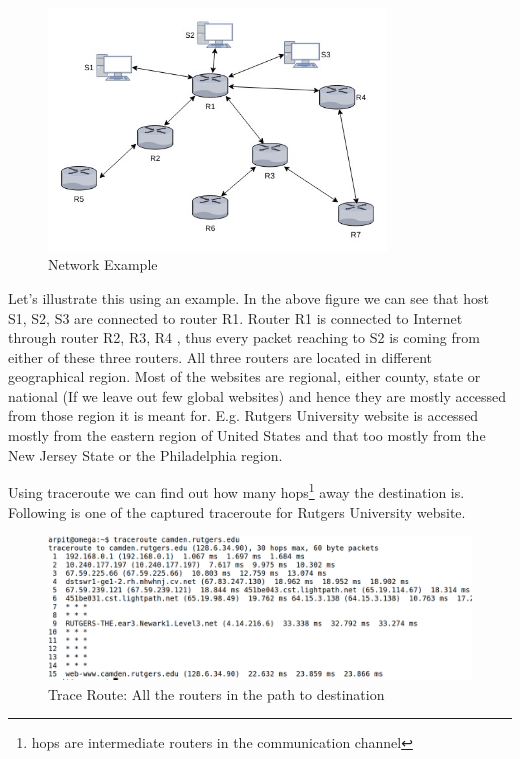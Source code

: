\documentclass[10pt,oneside,a4paper]{article}
\begin{document}
\begin{figure}[H]
\centering
\includegraphics[width=0.80\textwidth]{Routers}
\caption{Network Example} \label{fig:routers}
\end{figure}


Let's illustrate this using an example. In the above figure we can see that host S1, S2, S3 are connected to router R1. Router R1 is connected to Internet through router R2, R3, R4 , thus every packet reaching to S2 is coming from either of these three routers. All three routers are located in different geographical region. Most of the websites are regional, either county, state or national (If we leave out few global websites) and hence they are mostly accessed from those region it is meant for. E.g. Rutgers University website is accessed mostly from the eastern region of United States and that too mostly from the New Jersey State or the Philadelphia region.\par
Using traceroute we can find out how many hops\footnote{hops are intermediate routers in the communication channel} away the destination is. Following is one of the captured traceroute for Rutgers University website.\par
\begin{figure}[H]
\centering
\includegraphics[width=\textwidth]{TraceRoute}
\caption{Trace Route: All the routers in the path to destination} \label{fig:traceroute}
\end{figure}
\end{document}
